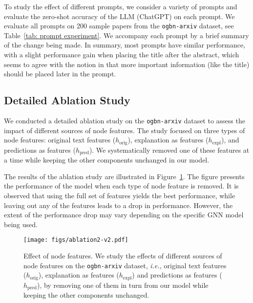 \documentclass{article}
\newcommand{\ie}{\emph{i.e.,}\xspace}
\begin{document}
To study the effect of different prompts, we consider a variety of prompts and evaluate the zero-shot accuracy of the LLM (ChatGPT) on each prompt. We evaluate all prompts on 200 sample papers from the \texttt{ogbn-arxiv} dataset, see Table~\ref{tab: prompt experiment}. We accompany each prompt by a brief summary of the change being made. In summary, most prompts have similar performance, with a slight performance gain when placing the title after the abstract, which seems to agree with the notion in \cite{zhao2021calibrate} that more important information (like the title) should be placed later in the prompt.




\subsection{Detailed Ablation Study}\label{subsec: ablation2}
We conducted a detailed ablation study on the \texttt{ogbn-arxiv} dataset to assess the impact of different sources of node features. The study focused on three types of node features: original text features ($h_\textrm{orig}$), explanation as features ($h_\textrm{expl}$), and predictions as features ($h_\textrm{pred}$). We systematically removed one of these features at a time while keeping the other components unchanged in our model.

The results of the ablation study are illustrated in Figure~\ref{fig: ablation2}. The figure presents the performance of the model when each type of node feature is removed. It is observed that using the full set of features yields the best performance, while leaving out any of the features leads to a drop in performance. However, the extent of the performance drop may vary depending on the specific GNN model being used.

\begin{figure}[!ht]
    \centering
    \texttt{[image: figs/ablation2-v2.pdf]} 
    \caption{Effect of node features. We study the effects of different sources of node features on the \texttt{ogbn-arxiv} dataset, \ie original text features ($h_\textrm{orig}$), explanation as features ($h_\textrm{expl}$) and predictions as features ($h_\textrm{pred}$), by removing one of them in turn from our model while keeping the other components unchanged.}
    \label{fig: ablation2}
\end{figure}
\end{document}

